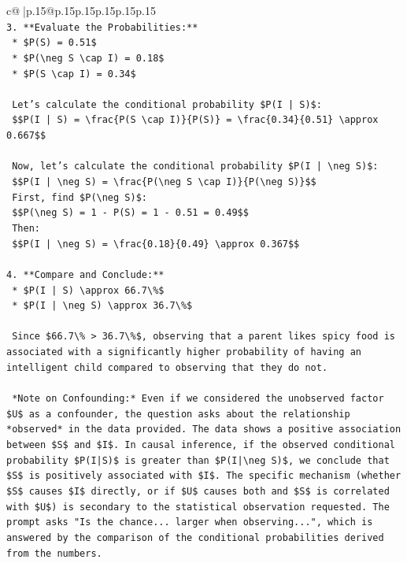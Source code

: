 \documentclass{article}
\begin{document}
{\begin{supertabular}{c@{$\;$}|p{.15\linewidth}@{}p{.15\linewidth}p{.15\linewidth}p{.15\linewidth}p{.15\linewidth}p{.15\linewidth}}
{{{\\ 
\texttt{3.  **Evaluate the Probabilities:**} \\
\texttt{    *   \$P(S) = 0.51\$} \\
\texttt{    *   \$P(\textbackslash{}neg S \textbackslash{}cap I) = 0.18\$} \\
\texttt{    *   \$P(S \textbackslash{}cap I) = 0.34\$} \\
\\ 
\texttt{    Let's calculate the conditional probability \$P(I | S)\$:} \\
\texttt{    \$\$P(I | S) = \textbackslash{}frac\{P(S \textbackslash{}cap I)\}\{P(S)\} = \textbackslash{}frac\{0.34\}\{0.51\} \textbackslash{}approx 0.667\$\$} \\
\\ 
\texttt{    Now, let's calculate the conditional probability \$P(I | \textbackslash{}neg S)\$:} \\
\texttt{    \$\$P(I | \textbackslash{}neg S) = \textbackslash{}frac\{P(\textbackslash{}neg S \textbackslash{}cap I)\}\{P(\textbackslash{}neg S)\}\$\$} \\
\texttt{    First, find \$P(\textbackslash{}neg S)\$:} \\
\texttt{    \$\$P(\textbackslash{}neg S) = 1 {-} P(S) = 1 {-} 0.51 = 0.49\$\$} \\
\texttt{    Then:} \\
\texttt{    \$\$P(I | \textbackslash{}neg S) = \textbackslash{}frac\{0.18\}\{0.49\} \textbackslash{}approx 0.367\$\$} \\
\\ 
\texttt{4.  **Compare and Conclude:**} \\
\texttt{    *   \$P(I | S) \textbackslash{}approx 66.7\textbackslash{}\%\$} \\
\texttt{    *   \$P(I | \textbackslash{}neg S) \textbackslash{}approx 36.7\textbackslash{}\%\$} \\
\\ 
\texttt{    Since \$66.7\textbackslash{}\% > 36.7\textbackslash{}\%\$, observing that a parent likes spicy food is associated with a significantly higher probability of having an intelligent child compared to observing that they do not.} \\
\\ 
\texttt{    *Note on Confounding:* Even if we considered the unobserved factor \$U\$ as a confounder, the question asks about the relationship *observed* in the data provided. The data shows a positive association between \$S\$ and \$I\$. In causal inference, if the observed conditional probability \$P(I|S)\$ is greater than \$P(I|\textbackslash{}neg S)\$, we conclude that \$S\$ is positively associated with \$I\$. The specific mechanism (whether \$S\$ causes \$I\$ directly, or if \$U\$ causes both and \$S\$ is correlated with \$U\$) is secondary to the statistical observation requested. The prompt asks "Is the chance... larger when observing...", which is answered by the comparison of the conditional probabilities derived from the numbers.} \\
}}}
\end{supertabular}}
\end{document}
